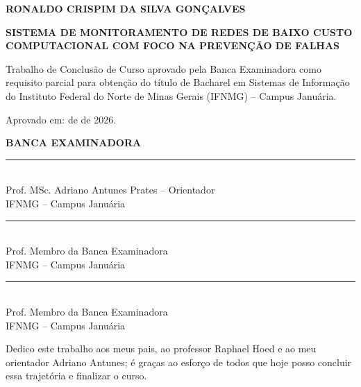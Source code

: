\documentclass[12pt,a4paper]{article}
\begin{document}
\clearpage
\thispagestyle{empty}
\begin{center}
\textbf{RONALDO CRISPIM DA SILVA GONÇALVES}

\vspace{1.5em}
\textbf{SISTEMA DE MONITORAMENTO DE REDES DE BAIXO CUSTO COMPUTACIONAL COM FOCO NA PREVENÇÃO DE FALHAS}
\end{center}

\vspace{1.5em}
\begin{flushright}
\begin{minipage}{0.52\textwidth}
\singlespacing
Trabalho de Conclusão de Curso aprovado pela Banca Examinadora como requisito parcial para obtenção do título de Bacharel em Sistemas de Informação do Instituto Federal do Norte de Minas Gerais (IFNMG) -- Campus Januária.
\end{minipage}
\end{flushright}

\vspace{2em}
\noindent Aprovado em: \underline{\hspace{1.5cm}} de \underline{\hspace{3.5cm}} de 2026.

\vfill
\begin{center}
\textbf{BANCA EXAMINADORA}

\vspace{2.5em}
\rule{11cm}{0.4pt}\\
Prof. MSc. Adriano Antunes Prates -- Orientador\\
IFNMG -- Campus Januária

\vspace{2.5em}
\rule{11cm}{0.4pt}\\
Prof. Membro da Banca Examinadora\\
IFNMG -- Campus Januária

\vspace{2.5em}
\rule{11cm}{0.4pt}\\
Prof. Membro da Banca Examinadora\\
IFNMG -- Campus Januária
\end{center}
\vfill
\clearpage

\thispagestyle{empty}
\vspace*{0.60\textheight}
\begin{flushright}
\begin{minipage}{0.52\textwidth}
Dedico este trabalho aos meus pais, ao professor Raphael Hoed e ao meu orientador Adriano Antunes; é graças ao esforço de todos que hoje posso concluir essa trajetória e finalizar o curso.\end{minipage}
\end{flushright}
\clearpage
\end{document}
